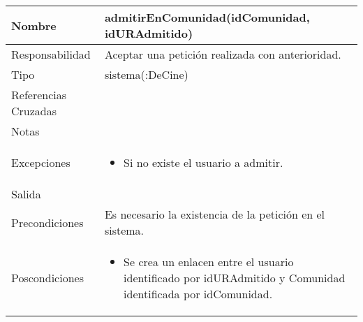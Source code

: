 \documentclass{article}
\begin{document}
\begin{table}[h]
\begin{tabular}{|l|l|l|l|l|l|}
\hline
\multicolumn{2}{|p{3cm}|}{Nombre} & \multicolumn{4}{p{10cm}|}{\textbf{admitirEnComunidad(idComunidad, idURAdmitido)}}\\
\hline
\multicolumn{2}{|p{3cm}|}{Responsabilidad} & \multicolumn{4}{p{10cm}|}{Aceptar una petición realizada con anterioridad.} \\
\hline
\multicolumn{2}{|p{3cm}|}{Tipo} & \multicolumn{4}{p{10cm}|}{sistema(:DeCine)} \\
\hline
\multicolumn{2}{|p{3cm}|}{Referencias Cruzadas} & \multicolumn{4}{p{10cm}|}{} \\
\hline
\multicolumn{2}{|p{3cm}|}{Notas} & \multicolumn{4}{p{10cm}|}{} \\
\hline
\multicolumn{2}{|p{3cm}|}{Excepciones} & \multicolumn{4}{p{10cm}|}{\begin{itemize}
\item Si no existe el usuario a admitir.
\end{itemize}} \\
\hline
\multicolumn{2}{|p{3cm}|}{Salida} & \multicolumn{4}{p{10cm}|}{} \\
\hline
\multicolumn{2}{|p{3cm}|}{Precondiciones} & \multicolumn{4}{p{10cm}|}{Es necesario la existencia de la petición en el sistema.} \\
\hline
\multicolumn{2}{|p{3cm}|}{Poscondiciones} & \multicolumn{4}{p{10cm}|}{\begin{itemize}
\item Se crea un enlacen entre el usuario identificado por idURAdmitido y Comunidad identificada por idComunidad.
\end{itemize}} \\
\hline
\end{tabular}
\end{table}
\end{document}
